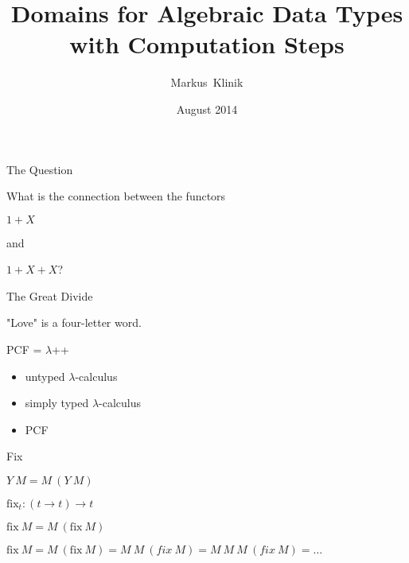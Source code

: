 \documentclass{beamer}
\title
{Domains for Algebraic Data Types with Computation Steps}
\author
{Markus~Klinik}
\institute[Radboud University Nijmegen]
{
  Radboud University Nijmegen
}
\date
{August 2014}
\newcommand{\fix}{\text{fix}}
\newcommand{\arr}{\rightarrow}
\begin{document}
\begin{frame}
  \titlepage
\end{frame}



\begin{frame}{The Question}

\begin{center}
What is the connection between the functors

$1+X$

and

$1+X+X$?
\end{center}

\end{frame}



\begin{frame}{The Great Divide}

\begin{center}
"Love" is a four-letter word.
\end{center}

\end{frame}




\begin{frame}{PCF = $\lambda$++}


\begin{itemize}
\item untyped $\lambda$-calculus
\item simply typed $\lambda$-calculus
\item PCF
\end{itemize}




\end{frame}


\begin{frame}{Fix}


\begin{center}

\onslide<+->
$Y\ M = M\ (Y\ M)$
\vspace{1em}

\onslide<+->
$\fix_t : (t \arr t) \arr t$
\vspace{1em}

$\fix\ M = M\ (\fix\ M)$
\vspace{1em}

\onslide<+->

$\fix\ M = M\ (\fix\ M) = M\ M\ (fix\ M) = M\ M\ M\ (fix\ M) = \ldots$
\end{center}


\end{frame}
\end{document}
